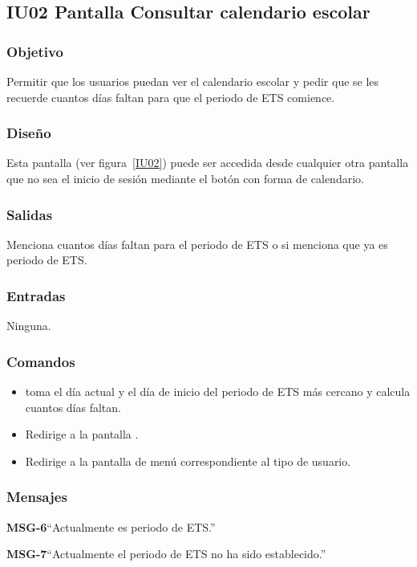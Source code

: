 
\subsection{IU02 Pantalla Consultar calendario escolar}

\subsubsection{Objetivo}
Permitir que los usuarios puedan ver el calendario escolar y pedir que se les recuerde cuantos días faltan para que el periodo de ETS comience.
\subsubsection{Diseño}
    Esta pantalla  (ver figura~\ref{IU02}) puede ser accedida desde cualquier otra pantalla que no sea el inicio de sesión mediante el botón con forma de calendario.


\newpage


\subsubsection{Salidas}

    Menciona cuantos días faltan para el periodo de ETS o si menciona que ya es periodo de ETS.

\subsubsection{Entradas}
   Ninguna.

\subsubsection{Comandos}
\begin{itemize}
    \item {} toma el día actual y el día de inicio del periodo de ETS más cercano y calcula cuantos días faltan.
    \item {} Redirige a la pantalla .
    \item {} Redirige a la pantalla de menú correspondiente al tipo de usuario.
\end{itemize}

\subsubsection{Mensajes}
     
\begin{Citemize}
    \item {\bf MSG-6}{``Actualmente es periodo de ETS.''}

    \item {\bf MSG-7}{``Actualmente el periodo de ETS no ha sido establecido.''}
\end{Citemize}

